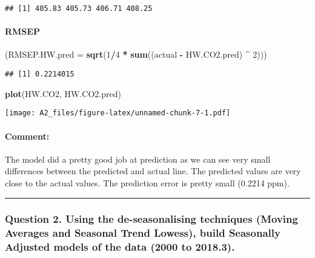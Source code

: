 \documentclass[]{article}
\newenvironment{Shaded}{\begin{snugshade}}{\end{snugshade}}
\newcommand{\DataTypeTok}[1]{\textcolor[rgb]{0.13,0.29,0.53}{#1}}
\newcommand{\DecValTok}[1]{\textcolor[rgb]{0.00,0.00,0.81}{#1}}
\newcommand{\KeywordTok}[1]{\textcolor[rgb]{0.13,0.29,0.53}{\textbf{#1}}}
\newcommand{\NormalTok}[1]{#1}
\newcommand{\OperatorTok}[1]{\textcolor[rgb]{0.81,0.36,0.00}{\textbf{#1}}}
\newcommand{\StringTok}[1]{\textcolor[rgb]{0.31,0.60,0.02}{#1}}
\let\oldparagraph\paragraph
\renewcommand{\paragraph}[1]{\oldparagraph{#1}\mbox{}}
\begin{document}
\begin{verbatim}
## [1] 405.83 405.73 406.71 408.25
\end{verbatim}

\hypertarget{rmsep}{%
\paragraph{RMSEP}\label{rmsep}}

\begin{Shaded}
\begin{Highlighting}[]
\NormalTok{(}\DataTypeTok{RMSEP.HW.pred =} \KeywordTok{sqrt}\NormalTok{(}\DecValTok{1}\OperatorTok{/}\DecValTok{4} \OperatorTok{*}\StringTok{ }\KeywordTok{sum}\NormalTok{((actual }\OperatorTok{-}\StringTok{ }\NormalTok{HW.CO2.pred) }\OperatorTok{^}\StringTok{ }\DecValTok{2}\NormalTok{)))}
\end{Highlighting}
\end{Shaded}

\begin{verbatim}
## [1] 0.2214015
\end{verbatim}

\begin{Shaded}
\begin{Highlighting}[]
\KeywordTok{plot}\NormalTok{(HW.CO2, HW.CO2.pred)}
\end{Highlighting}
\end{Shaded}

\texttt{[image: A2\_files/figure-latex/unnamed-chunk-7-1.pdf]}

\hypertarget{comment}{%
\paragraph{Comment:}\label{comment}}

The model did a pretty good job at prediction as we can see very small
differences between the predicted and actual line. The predicted values
are very close to the actual values. The prediction error is pretty
small (0.2214 ppm).

\begin{center}\rule{0.5\linewidth}{\linethickness}\end{center}

\hypertarget{question-2.-using-the-de-seasonalising-techniques-moving-averages-and-seasonal-trend-lowess-build-seasonally-adjusted-models-of-the-data-2000-to-2018.3.}{%
\subsubsection{Question 2. Using the de-seasonalising techniques (Moving
Averages and Seasonal Trend Lowess), build Seasonally Adjusted models of
the data (2000 to
2018.3).}\label{question-2.-using-the-de-seasonalising-techniques-moving-averages-and-seasonal-trend-lowess-build-seasonally-adjusted-models-of-the-data-2000-to-2018.3.}}
\end{document}
